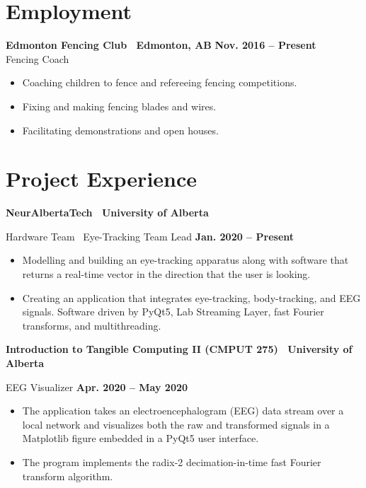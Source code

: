 \documentclass{article}
\begin{document}
\section*{\textcolor{my_red}{Employment}}
    \textbf{Edmonton Fencing Club \textbar\ Edmonton, AB} \hfill \textbf{Nov. 2016 -- Present}\\
    Fencing  Coach \vspace{-0.75em}
    \begin{itemize}
        \item Coaching children to fence and refereeing fencing competitions.
        \item Fixing and making fencing blades and wires.
        \item Facilitating demonstrations and open houses.
    \end{itemize}


\section*{\textcolor{my_red}{Project Experience}}
    \textbf{NeurAlbertaTech \textbar\ University of Alberta}

    Hardware Team \textbar\ Eye-Tracking Team Lead \hfill \textbf{Jan. 2020 -- Present}
    \begin{itemize}
        \item Modelling and building an eye-tracking apparatus along with software that returns a real-time vector in the direction that the user is looking.
        \item Creating an application that integrates eye-tracking, body-tracking, and EEG signals. Software driven by PyQt5, Lab Streaming Layer, fast Fourier transforms, and multithreading.
    \end{itemize}

    \textbf{Introduction to Tangible Computing II (CMPUT 275) \textbar\ University of Alberta}

    EEG Visualizer \hfill \textbf{Apr. 2020 -- May 2020}
    \begin{itemize}
        \item The application takes an electroencephalogram (EEG) data stream over a local network and visualizes both the raw and transformed signals in a Matplotlib figure embedded in a PyQt5 user interface.
        \item The program implements the radix-2 decimation-in-time fast Fourier transform algorithm.
    \end{itemize}
\end{document}
